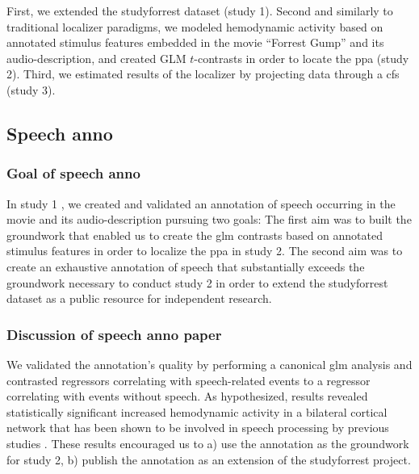 
%
First, we extended the studyforrest dataset (study 1).
%
Second and similarly to traditional localizer paradigms, we modeled hemodynamic
activity based on annotated stimulus features embedded in the movie ``Forrest
Gump'' and its audio-description, and created GLM $t$-contrasts in order to
locate the \ac{ppa} (study 2).
%
Third, we estimated results of the localizer by projecting data through a
\ac{cfs} (study 3).


\subsection{Speech anno}


\subsubsection{Goal of speech anno}

In study 1 \citep{haeusler2021speechanno}, we created and validated an
annotation of speech occurring in the movie and its audio-description pursuing
two goals:
The first aim was to built the groundwork that enabled us to create the \ac{glm}
contrasts based on annotated stimulus features in order to localize the \ac{ppa}
in study 2.
The second aim was to create an exhaustive annotation of speech that
substantially exceeds the groundwork necessary to conduct study 2 in order to
extend the studyforrest dataset as a public resource for independent research.


\subsubsection{Discussion of speech anno paper}

We validated the annotation's quality by performing a canonical \ac{glm}
analysis and  contrasted regressors correlating with speech-related events to a
regressor correlating with events without speech.
As hypothesized, results revealed statistically significant increased
hemodynamic activity in a bilateral cortical network that has been shown to be
involved in speech processing by previous studies
\citep[e.g.,][]{friederici2011brain, wilson2008beyond}.
These results encouraged us to a) use the annotation as the groundwork for study
2, b) publish the annotation as an extension of the studyforrest project.



